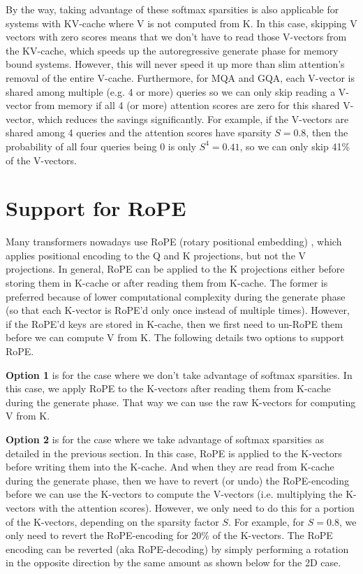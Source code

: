 \documentclass{article}
\numberwithin{equation}{section} %
\begin{document}
By the way, taking advantage of these softmax sparsities is also applicable for systems with KV-cache where V is not computed from K. In this case, skipping V vectors with zero scores means that we don’t have to read those V-vectors from the KV-cache, which speeds up the autoregressive generate phase for memory bound systems. However, this will never speed it up more than slim attention's removal of the entire V-cache. Furthermore, for MQA and GQA, each V-vector is shared among multiple (e.g. 4 or more) queries so we can only skip reading a V-vector from memory if all 4 (or more) attention scores are zero for this shared V-vector, which reduces the savings significantly. For example, if the V-vectors are shared among 4 queries and the attention scores have sparsity $S = 0.8$, then the probability of all four queries being 0 is only $S^4 = 0.41$, so we can only skip 41\% of the V-vectors.

\section{Support for RoPE}
Many transformers nowadays use RoPE (rotary positional embedding) \citep{RoPE}, which applies positional encoding to the Q and K projections, but not the V projections. In general, RoPE can be applied to the K projections either before storing them in K-cache or after reading them from K-cache. The former is preferred because of lower computational complexity during the generate phase (so that each K-vector is RoPE’d only once instead of multiple times). However, if the RoPE’d keys are stored in K-cache, then we first need to un-RoPE them before we can compute V from K. The following details two options to support RoPE.

\textbf{Option 1} is for the case where we don’t take advantage of softmax sparsities. In this case, we apply RoPE to the K-vectors after reading them from K-cache during the generate phase. That way we can use the raw K-vectors for computing V from K.

\textbf{Option 2} is for the case where we take advantage of softmax sparsities as detailed in the previous section. In this case, RoPE is applied to the K-vectors before writing them into the K-cache. And when they are read from K-cache during the generate phase, then we have to revert (or undo) the RoPE-encoding before we can use the K-vectors to compute the V-vectors (i.e. multiplying the K-vectors with the attention scores). However, we only need to do this for a portion of the K-vectors, depending on the sparsity factor $S$. For example, for $S = 0.8$, we only need to revert the RoPE-encoding for 20\% of the K-vectors. The RoPE encoding can be reverted (aka RoPE-decoding) by simply performing a rotation in the opposite direction by the same amount as shown below for the 2D case.
\end{document}
